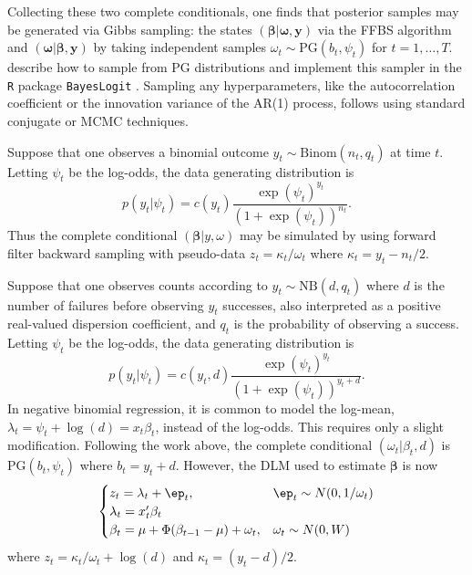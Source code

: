 \documentclass[12pt]{article}
\newcommand{\PG}{\text{PG}}
\newcommand{\NB}{\text{NB}}
\newcommand{\bbeta}{\boldsymbol{\beta}}
\newcommand{\oomega}{\boldsymbol{\omega}}
\newcommand{\yy}{\boldsymbol{y}}
\begin{document}
Collecting these two complete conditionals, one finds that posterior samples may
be generated via Gibbs sampling: the states $(\bbeta|\oomega, \yy)$ via the FFBS
algorithm and $(\oomega | \bbeta, \yy)$ by taking independent samples $\omega_t
\sim \PG(b_t, \psi_t)$ for $t=1, \ldots, T$.  \cite{polson-etal-2013} describe
how to sample from $\PG$ distributions and implement this sampler in the
\texttt{R} package \texttt{BayesLogit} \citep{bayeslogit-2013}.  Sampling any
hyperparameters, like the autocorrelation coefficient or the innovation variance
of the AR(1) process, follows using standard conjugate or MCMC techniques.

\begin{example}
  Suppose that one observes a binomial outcome $y_t \sim \text{Binom}(n_t, q_t)$
  at time $t$.  Letting $\psi_t$ be the log-odds, the data generating
  distribution is
\[
p(y_t | \psi_t) = c(y_t) \frac{\exp(\psi_t)^{y_t}}{(1+\exp({\psi_t}))^{n_t}}.
\]
Thus the complete conditional $(\bbeta | y, \omega)$ may be simulated by using
forward filter backward sampling with pseudo-data $z_t = \kappa_t / \omega_t$
where $\kappa_t = y_t - n_t / 2$.
\end{example}


\begin{example}
  Suppose that one observes counts according to $y_t \sim \NB(d, q_t)$ where $d$
  is the number of failures before observing $y_t$ successes, also interpreted
  as a positive real-valued dispersion coefficient, and $q_t$ is the probability
  of observing a success.  Letting $\psi_t$ be the log-odds, the data generating
  distribution is
\[
p(y_t | \psi_t) = c(y_t, d) \frac{\exp({\psi_t})^{y_t}}{(1+\exp({\psi_t}))^{y_t+d}}.
\]
In negative binomial regression, it is common to model the log-mean, $\lambda_t
= \psi_t + \log(d) = x_t \beta_t$, instead of the log-odds.  This requires only
a slight modification.  Following the work above, the complete conditional
$(\omega_t | \beta_t, d)$ is $\PG(b_t, \psi_t)$ where $b_t = y_t + d$.  However,
the DLM used to estimate $\bbeta$ is now
\[
\begin{cases}
z_t = \lambda_t + \ep_t, & \ep_t \sim N(0, 1/\omega_t) \\
\lambda_t = x_t' \beta_t \\
\beta_t = \mu + \Phi (\beta_{t-1} - \mu) + \omega_t, & \omega_t \sim N(0, W)
\end{cases}
\]
where $z_t = \kappa_t / \omega_t + \log(d)$ and $\kappa_t = (y_t - d) / 2$.
\end{example}
\end{document}
